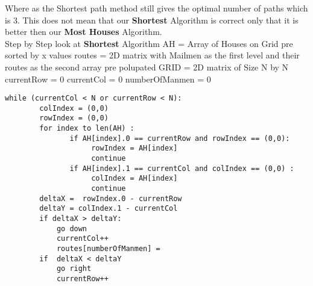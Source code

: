 \documentclass[11pt]{article}
\begin{document}
\hfill \break
\break
Where as the Shortest path method still gives the optimal number of paths which is 3. This does not mean that our  \textbf{Shortest} Algorithm is correct only that it is better then our \textbf{Most Houses} Algorithm.
\hfill \break
\break
\\
Step by Step look at \textbf{Shortest} Algorithm
\hfill \break
\break
AH = Array of Houses on Grid pre sorted by x values
\newline
routes =  2D matrix with Mailmen as the first level and their routes as the second array pre polupated 
GRID = 2D matrix of Size N by N
\newline
currentRow = 0
\newline
currentCol = 0
\newline
numberOfManmen = 0
\begin{lstlisting}
while (currentCol < N or currentRow < N):
        colIndex = (0,0)
        rowIndex = (0,0)
        for index to len(AH) :
               if AH[index].0 == currentRow and rowIndex == (0,0):
                    rowIndex = AH[index]
                    continue
               if AH[index].1 == currentCol and colIndex == (0,0) :
                    colIndex = AH[index]
                    continue
        deltaX =  rowIndex.0 - currentRow
        deltaY = colIndex.1 - currentCol
        if deltaX > deltaY:
            go down
            currentCol++
            routes[numberOfManmen] = 
        if  deltaX < deltaY
            go right
            currentRow++
            
            
        
        
        
           
            
            
                
                
    
\end{lstlisting}





 


\pagebreak
\end{document}

